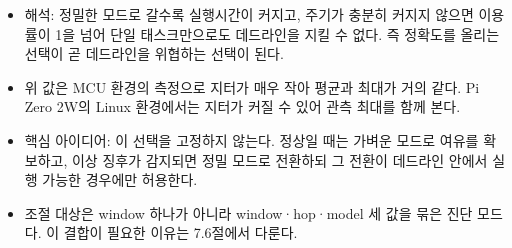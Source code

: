 \documentclass[10pt]{article}
\begin{document}
\begin{itemize}
\item 해석: 정밀한 모드로 갈수록 실행시간이 커지고, 주기가 충분히 커지지 않으면 이용률이 1을 넘어 단일 태스크만으로도 데드라인을 지킬 수 없다. 즉 정확도를 올리는 선택이 곧 데드라인을 위협하는 선택이 된다.
\item 위 값은 MCU 환경의 측정으로 지터가 매우 작아 평균과 최대가 거의 같다. Pi Zero 2W의 Linux 환경에서는 지터가 커질 수 있어 관측 최대를 함께 본다.
\item 핵심 아이디어: 이 선택을 고정하지 않는다. 정상일 때는 가벼운 모드로 여유를 확보하고, 이상 징후가 감지되면 정밀 모드로 전환하되 그 전환이 데드라인 안에서 실행 가능한 경우에만 허용한다.
\item 조절 대상은 window 하나가 아니라 window·hop·model 세 값을 묶은 진단 모드다. 이 결합이 필요한 이유는 7.6절에서 다룬다.
\end{itemize}
\noindent{}
\end{document}
